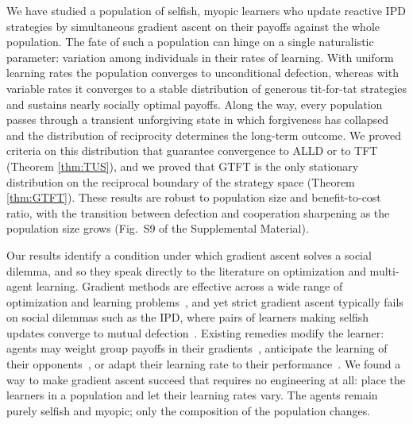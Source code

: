 \documentclass[10pt]{article}
\begin{document}
We have studied a population of selfish, myopic learners who update reactive IPD strategies by simultaneous gradient ascent on their payoffs against the whole population. The fate of such a population can hinge on a single naturalistic parameter: variation among individuals in their rates of learning. With uniform learning rates the population converges to unconditional defection, whereas with variable rates it converges to a stable distribution of generous tit-for-tat strategies and sustains nearly socially optimal payoffs. Along the way, every population passes through a transient unforgiving state in which forgiveness has collapsed and the distribution of reciprocity determines the long-term outcome. We proved criteria on this distribution that guarantee convergence to ALLD or to TFT (Theorem \ref{thm:TUS}), and we proved that GTFT is the only stationary distribution on the reciprocal boundary of the strategy space (Theorem \ref{thm:GTFT}). These results are robust to population size and benefit-to-cost ratio, with the transition between defection and cooperation sharpening as the population size grows (Fig.~S9 of the Supplemental Material).

Our results identify a condition under which gradient ascent solves a social dilemma, and so they speak directly to the literature on optimization and multi-agent learning. Gradient methods are effective across a wide range of optimization and learning problems~\cite{singh2000-NashConvergenceGradient,zinkevich2003-OnlineConvexProgramming}, and yet strict gradient ascent typically fails on social dilemmas such as the IPD, where pairs of learners making selfish updates converge to mutual defection~\cite{sandholm1996-MultiagentReinforcementLearning,macy2002-LearningDynamicsSocial,tuyls2006-EvolutionaryDynamicalAnalysis,bloembergen2015-EvolutionaryDynamicsMultiAgent}. Existing remedies modify the learner: agents may weight group payoffs in their gradients~\cite{zhang2019-SAIGAMultiagentReinforcement}, anticipate the learning of their opponents~\cite{foerster2018-LearningOpponentLearningAwareness}, or adapt their learning rate to their performance~\cite{bowling2002-MultiagentLearningUsing}. We found a way to make gradient ascent succeed that requires no engineering at all: place the learners in a population and let their learning rates vary. The agents remain purely selfish and myopic; only the composition of the population changes.
\end{document}
